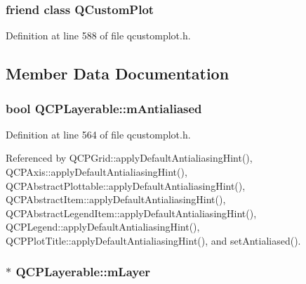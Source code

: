 \subsubsection[{Q\+Custom\+Plot}]{\setlength{\rightskip}{0pt plus 5cm}friend class {\bf Q\+Custom\+Plot}\hspace{0.3cm}{\ttfamily [friend]}}\label{class_q_c_p_layerable_a1cdf9df76adcfae45261690aa0ca2198}


Definition at line 588 of file qcustomplot.\+h.



\subsection{Member Data Documentation}
\hypertarget{class_q_c_p_layerable_a3ab45a4c76a3333ce42eb217a81733ec}{}
\subsubsection[{m\+Antialiased}]{\setlength{\rightskip}{0pt plus 5cm}bool Q\+C\+P\+Layerable\+::m\+Antialiased\hspace{0.3cm}{\ttfamily [protected]}}\label{class_q_c_p_layerable_a3ab45a4c76a3333ce42eb217a81733ec}


Definition at line 564 of file qcustomplot.\+h.



Referenced by Q\+C\+P\+Grid\+::apply\+Default\+Antialiasing\+Hint(), Q\+C\+P\+Axis\+::apply\+Default\+Antialiasing\+Hint(), Q\+C\+P\+Abstract\+Plottable\+::apply\+Default\+Antialiasing\+Hint(), Q\+C\+P\+Abstract\+Item\+::apply\+Default\+Antialiasing\+Hint(), Q\+C\+P\+Abstract\+Legend\+Item\+::apply\+Default\+Antialiasing\+Hint(), Q\+C\+P\+Legend\+::apply\+Default\+Antialiasing\+Hint(), Q\+C\+P\+Plot\+Title\+::apply\+Default\+Antialiasing\+Hint(), and set\+Antialiased().

\hypertarget{class_q_c_p_layerable_aa38ec5891aff0f50b36fd63e9372a0cd}{}
\subsubsection[{m\+Layer}]{$\ast$ Q\+C\+P\+Layerable\+::m\+Layer\hspace{0.3cm}{\ttfamily [protected]}}\label{class_q_c_p_layerable_aa38ec5891aff0f50b36fd63e9372a0cd}


